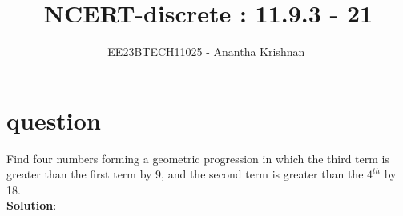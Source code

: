 \documentclass[journal,12pt,onecolumn]{IEEEtran}
\theoremstyle{remark}
\begin{document}

\vspace{3cm}

\title{NCERT-discrete : 11.9.3 - 21}
\author{EE23BTECH11025 - Anantha Krishnan $^{}$%
}
\maketitle
\bigskip

\renewcommand{\thefigure}{\theenumi}
\renewcommand{\thetable}{\theenumi}
\section{question}
Find four numbers forming a geometric progression in which the third term is greater than the first term by 9, and the second term is greater than the $4^{th}$ by 18.\\

\textbf{Solution}:
\end{document}
